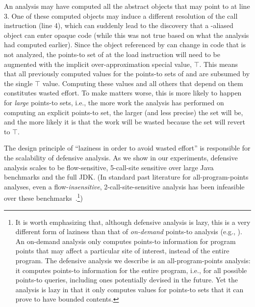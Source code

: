 An analysis may have computed all the abstract objects that
 may point to at line 3. One of these computed objects may
induce a different resolution of the call instruction (line 4), which
can suddenly lead to the discovery that a -aliased object
can enter opaque code (while this was not true based on what the
analysis had computed earlier). Since the object referenced by
 can change in code that is not analyzed, the points-to set
of  at the load instruction will need to be augmented with the
implicit over-approximation special value, $\top$.  This means that
all previously computed values for the points-to sets of  and
 are subsumed by the single $\top$ value. Computing these
values and all others that depend on them constitutes wasted
effort. To make matters worse, this is more likely to happen for
\emph{large} points-to sets, i.e., the more work the analysis has
performed on computing an explicit points-to set, the larger (and less
precise) the set will be, and the more likely it is that the work will
be wasted because the set will revert to $\top$.



The design principle of ``laziness in order to avoid wasted effort''
is responsible for the scalability of defensive analysis. As we show
in our experiments, defensive analysis scales to be flow-sensitive,
5-call-site sensitive over large Java benchmarks and the full JDK.
(In standard past literature for all-program-points analyses, even a
flow-\emph{insensitive}, 2-call-site-sensitive analysis has been
infeasible over these
benchmarks~\cite{pldi:2014:Smaragdakis}.\footnote{It is
  worth emphasizing that, although defensive analysis is lazy, this
  is a very different form of laziness than that of \emph{on-demand}
  points-to analysis (e.g.,
  \cite{ecoop:2016:Spath,popl:1997:Biswas}). An
  on-demand analysis only computes points-to information for program
  points that may affect a particular site of interest, instead of the
  entire program. The defensive analysis we describe is an
  all-program-points analysis: it computes points-to information for
  the entire program, i.e., for all possible points-to queries,
  including ones potentially devised in the future. Yet the analysis is
  lazy in that it only computes values for points-to sets that it can
  prove to have bounded contents.})

